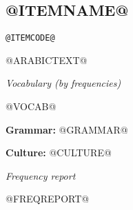 \subsection*{@ITEMNAME@}

\tiny
\begin{flushright}\texttt{@ITEMCODE@}\end{flushright}

\begin{arab}[novoc]
\large \noindent @ARABICTEXT@
\end{arab}

\normalsize
\begin{center}\textit{Vocabulary (by frequencies)}\end{center}
\footnotesize
\begin{multicols}{2}

\noindent
@VOCAB@ %
\end{multicols}

\normalsize
\noindent \textbf{Grammar:} @GRAMMAR@

\normalsize
\noindent \textbf{Culture:} @CULTURE@

\normalsize
\begin{center}\textit{Frequency report}\end{center}
\tiny
\begin{multicols}{5}
\noindent
@FREQREPORT@ %
\end{multicols}
